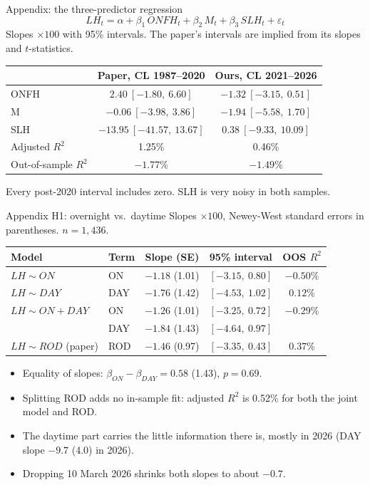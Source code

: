 \documentclass[aspectratio=169,10pt]{beamer}
\begin{document}
\begin{frame}{Appendix: the three-predictor regression}
  \[ LH_t = \alpha + \beta_1\, ONFH_t + \beta_2\, M_t + \beta_3\, SLH_t + \varepsilon_t \]
  Slopes $\times 100$ with 95\% intervals. The paper's intervals are implied from its slopes and $t$-statistics.
  \vspace{4pt}
  \begin{center}
  \begin{tabular}{lcc}
    \hline
    & Paper, CL 1987--2020 & Ours, CL 2021--2026\\
    \hline
    ONFH & $2.40\ [-1.80,\ 6.60]$ & $-1.32\ [-3.15,\ 0.51]$\\
    M & $-0.06\ [-3.98,\ 3.86]$ & $-1.94\ [-5.58,\ 1.70]$\\
    SLH & $-13.95\ [-41.57,\ 13.67]$ & $0.38\ [-9.33,\ 10.09]$\\
    \hline
    Adjusted $R^2$ & 1.25\% & 0.46\%\\
    Out-of-sample $R^2$ & $-1.77\%$ & $-1.49\%$\\
    \hline
  \end{tabular}
  \end{center}
  Every post-2020 interval includes zero. SLH is very noisy in both samples.
\end{frame}
\begin{frame}{Appendix H1: overnight vs.\ daytime}
  \small
  Slopes $\times 100$, Newey-West standard errors in parentheses. $n=1{,}436$.
  \begin{center}
  \begin{tabular}{llccc}
    \hline
    Model & Term & Slope (SE) & 95\% interval & OOS $R^2$\\
    \hline
    $LH\sim ON$ & ON & $-1.18$ (1.01) & $[-3.15,\ 0.80]$ & $-0.50\%$\\
    $LH\sim DAY$ & DAY & $-1.76$ (1.42) & $[-4.53,\ 1.02]$ & $0.12\%$\\
    $LH\sim ON+DAY$ & ON & $-1.26$ (1.01) & $[-3.25,\ 0.72]$ & $-0.29\%$\\
     & DAY & $-1.84$ (1.43) & $[-4.64,\ 0.97]$ & \\
    $LH\sim ROD$ (paper) & ROD & $-1.46$ (0.97) & $[-3.35,\ 0.43]$ & $0.37\%$\\
    \hline
  \end{tabular}
  \end{center}
  \begin{itemize}
    \item Equality of slopes: $\beta_{ON}-\beta_{DAY}=0.58$ (1.43), $p=0.69$.
    \item Splitting ROD adds no in-sample fit: adjusted $R^2$ is 0.52\% for both the joint model and ROD.
    \item The daytime part carries the little information there is, mostly in 2026 (DAY slope $-9.7$ (4.0) in 2026).
    \item Dropping 10 March 2026 shrinks both slopes to about $-0.7$.
  \end{itemize}
\end{frame}
\end{document}
